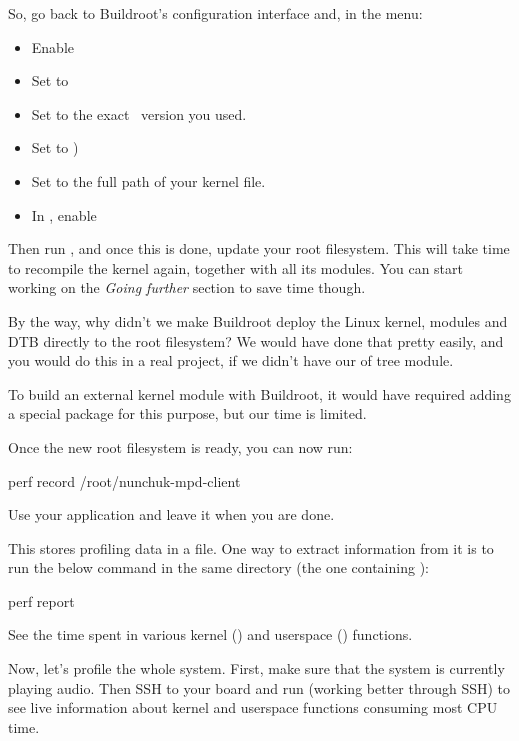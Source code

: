 So, go back to Buildroot's configuration interface and, in the
 menu:
\begin{itemize}
\item Enable 
\item Set  to 
\item Set  to the exact \workingkernel ~version
      you used.
\item Set  to )
\item Set  to the full path of your kernel  file.
\item In , enable 
\end{itemize}

Then run , and once this is done, update your root
filesystem. This will take time to recompile the kernel again, together
with all its modules. You can start working on the {\em Going further}
section to save time though.

By the way, why didn't we make Buildroot deploy the Linux kernel,
modules and DTB directly to the root filesystem? We would have done that
pretty easily, and you would do this in a real project, if we didn't
have our of tree module.

To build an external kernel module with Buildroot, it would have required
adding a special package for this purpose, but our time is limited.

Once the new root filesystem is ready, you can now run:

\begin{bashinput}
perf record /root/nunchuk-mpd-client
\end{bashinput}

Use your application and leave it when you are done.

This stores profiling data in a  file. One way to
extract information from it is to run the below command in the same
directory (the one containing ):

\begin{bashinput}
perf report
\end{bashinput}

See the time spent in various kernel (\code{[k]}) and userspace
(\code{[.]}) functions.

Now, let's profile the whole system. First, make sure that the system is
currently playing audio. Then SSH to your board and run 
(working better through SSH) to see live information about kernel and
userspace functions consuming most CPU time.

